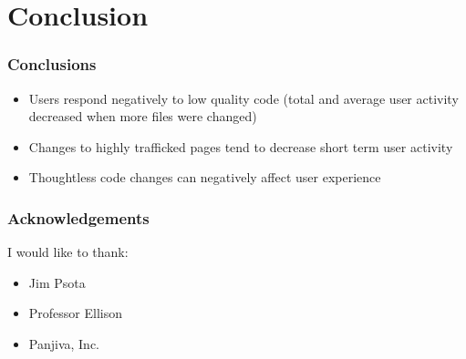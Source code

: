 \documentclass[xcolor=pdftex,dvipsnames,table]{beamer}
\begin{document}
\section{Conclusion}

\frame{\tableofcontents[currentsection]}

\frame
{
    \frametitle{Conclusions}
    \begin{itemize}
        \item Users respond negatively to low quality code (total and average user activity decreased when more files were changed)
        \item Changes to highly trafficked pages tend to decrease short term user activity 
        \item Thoughtless code changes can negatively affect user experience
    \end{itemize}
}

\frame
{
    \frametitle{Acknowledgements}
    I would like to thank:
    \begin{itemize}
        \item Jim Psota
        \item Professor Ellison
        \item Panjiva, Inc.
    \end{itemize}
}
\end{document}
